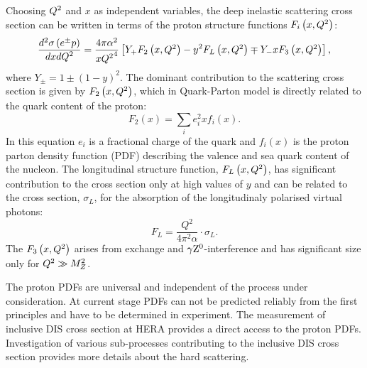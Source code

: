 Choosing $\mbox{${Q^2}$}$ and $x$ as independent variables, the deep inelastic scattering cross section can be written in terms of the proton structure functions $F_i\left(x,\mbox{${Q^2}$}\right)$:
\begin{equation}
\frac{d^2\sigma\left( e^\pm p \right) }{dxd\mbox{${Q^2}$}} = \frac{4\pi\alpha^2}{x\mbox{${Q^2}$}^4}\left[ Y_+F_2\left(x,\mbox{${Q^2}$}\right) - y^2F_L\left(x,\mbox{${Q^2}$}\right) \mp Y_-xF_3\left(x,\mbox{${Q^2}$}\right) \right],
\label{eq:ddifDIS}
\end{equation}
where $Y_\pm = 1 \pm \left( 1 - y \right)^2$. The dominant contribution to the scattering cross section is given by $F_2\left(x,\mbox{${Q^2}$}\right)$, which in Quark-Parton model is directly related to the quark content of the proton:
\begin{equation}
F_2\left(x\right) = \sum_i{e_i^2xf_i\left(x\right)}.
\label{eq:f2pdf}
\end{equation}
In this equation $e_i$ is a fractional charge of the quark and $f_i\left(x\right)$ is the proton parton density function (PDF) describing the valence and sea quark content of the nucleon. The longitudinal structure function, $F_L\left(x,\mbox{${Q^2}$}\right)$, has significant contribution to the cross section only at high values of $y$ and can be related to the cross section, $\sigma_L$, for the absorption of the longitudinaly polarised virtual photons:
\begin{equation}
F_L = \frac{Q^2}{4\pi^2\alpha}\cdot \sigma_L.
\label{eq:sigmal}
\end{equation}
 The $F_3\left(x,\mbox{${Q^2}$}\right)$ arises from \zn exchange and $\gamma\mbox{$\rm{Z}^0$}$-interference and has significant size only for $\mbox{${Q^2}$} \gg M^2_Z$.

The proton PDFs are universal and independent of the process under consideration. At current stage PDFs can not be predicted reliably from the first principles and have to be determined in experiment. The measurement of inclusive DIS cross section at HERA provides a direct access to the proton PDFs. Investigation of various sub-processes contributing to the inclusive DIS cross section provides more details about the hard scattering.
